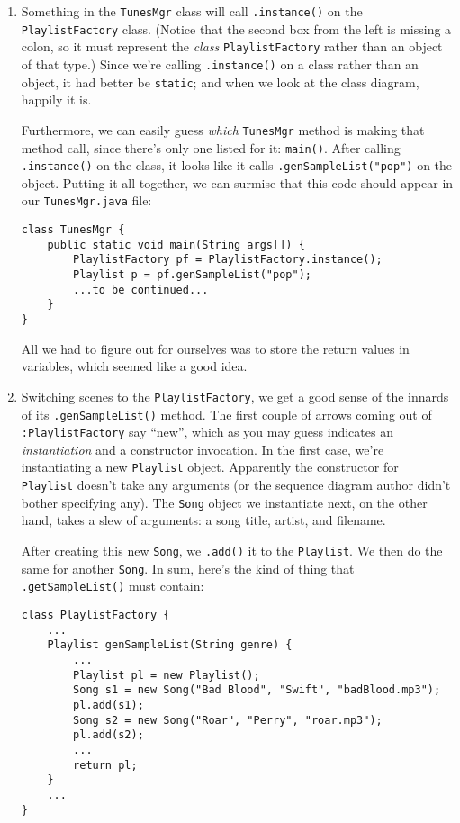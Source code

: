 \begin{enumerate}
\itemsep.1em

\item Something in the \texttt{TunesMgr} class will call \texttt{.instance()}
on the \texttt{PlaylistFactory} class. (Notice that the second box from the
left is missing a colon, so it must represent the \textit{class}
\texttt{PlaylistFactory} rather than an object of that type.) Since we're
calling \texttt{.instance()} on a class rather than an object, it had better
be \texttt{static}; and when we look at the class diagram, happily it is.

Furthermore, we can easily guess \textit{which} \texttt{TunesMgr} method is
making that method call, since there's only one listed for it:
\texttt{main()}. After calling \texttt{.instance()} on the class, it looks
like it calls \texttt{.genSampleList("pop")} on the object. Putting it all
together, we can surmise that this code should appear in our
\texttt{TunesMgr.java} file:

\begin{Verbatim}[fontsize=\footnotesize,samepage=true,frame=single]
class TunesMgr {
    public static void main(String args[]) {
        PlaylistFactory pf = PlaylistFactory.instance();
        Playlist p = pf.genSampleList("pop");
        ...to be continued...
    }
}
\end{Verbatim}

All we had to figure out for ourselves was to store the return values in
variables, which seemed like a good idea.

\item Switching scenes to the \texttt{PlaylistFactory}, we get a good sense of
the innards of its \texttt{.genSampleList()} method. The first couple of
arrows coming out of \texttt{:PlaylistFactory} say ``new'', which as you may
guess indicates an \textit{instantiation} and a constructor invocation. In
the first case, we're instantiating a new \texttt{Playlist} object. Apparently
the constructor for \texttt{Playlist} doesn't take any arguments (or the
sequence diagram author didn't bother specifying any). The \texttt{Song}
object we instantiate next, on the other hand, takes a slew of arguments: a
song title, artist, and filename.

After creating this new \texttt{Song}, we \texttt{.add()} it to the
\texttt{Playlist}. We then do the same for another \texttt{Song}. In sum,
here's the kind of thing that \texttt{.getSampleList()} must contain:

\begin{Verbatim}[fontsize=\footnotesize,samepage=true,frame=single]
class PlaylistFactory {
    ...
    Playlist genSampleList(String genre) {
        ...
        Playlist pl = new Playlist();
        Song s1 = new Song("Bad Blood", "Swift", "badBlood.mp3");
        pl.add(s1);
        Song s2 = new Song("Roar", "Perry", "roar.mp3");
        pl.add(s2);
		...
        return pl;
    }
    ...
}
\end{Verbatim}


\end{enumerate}
